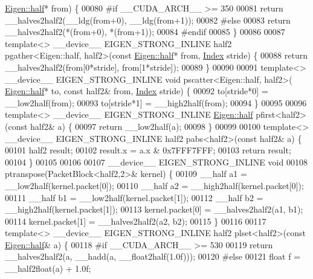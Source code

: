 \begin{DoxyCode}
      \hyperlink{struct_eigen_1_1half}{Eigen::half}* from) \{
00080 \textcolor{preprocessor}{#if \_\_CUDA\_ARCH\_\_ >= 350}
00081    \textcolor{keywordflow}{return} \_\_halves2half2(\_\_ldg(from+0), \_\_ldg(from+1));
00082 \textcolor{preprocessor}{#else}
00083   \textcolor{keywordflow}{return} \_\_halves2half2(*(from+0), *(from+1));
00084 \textcolor{preprocessor}{#endif}
00085 \}
00086 
00087 \textcolor{keyword}{template}<> \_\_device\_\_ EIGEN\_STRONG\_INLINE half2 pgather<Eigen::half, half2>(\textcolor{keyword}{const} 
      \hyperlink{struct_eigen_1_1half}{Eigen::half}* from, \hyperlink{namespace_eigen_a62e77e0933482dafde8fe197d9a2cfde}{Index} stride) \{
00088   \textcolor{keywordflow}{return} \_\_halves2half2(from[0*stride], from[1*stride]);
00089 \}
00090 
00091 \textcolor{keyword}{template}<> \_\_device\_\_ EIGEN\_STRONG\_INLINE \textcolor{keywordtype}{void} pscatter<Eigen::half, half2>(
      \hyperlink{struct_eigen_1_1half}{Eigen::half}* to, \textcolor{keyword}{const} half2& from, \hyperlink{namespace_eigen_a62e77e0933482dafde8fe197d9a2cfde}{Index} stride) \{
00092   to[stride*0] = \_\_low2half(from);
00093   to[stride*1] = \_\_high2half(from);
00094 \}
00095 
00096 \textcolor{keyword}{template}<> \_\_device\_\_ EIGEN\_STRONG\_INLINE \hyperlink{struct_eigen_1_1half}{Eigen::half} pfirst<half2>(\textcolor{keyword}{const} half2& a) \{
00097   \textcolor{keywordflow}{return} \_\_low2half(a);
00098 \}
00099 
00100 \textcolor{keyword}{template}<> \_\_device\_\_ EIGEN\_STRONG\_INLINE half2 pabs<half2>(\textcolor{keyword}{const} half2& a) \{
00101   half2 result;
00102   result.x = a.x & 0x7FFF7FFF;
00103   \textcolor{keywordflow}{return} result;
00104 \}
00105 
00106 
00107 \_\_device\_\_ EIGEN\_STRONG\_INLINE \textcolor{keywordtype}{void}
00108 ptranspose(PacketBlock<half2,2>& kernel) \{
00109   \_\_half a1 = \_\_low2half(kernel.packet[0]);
00110   \_\_half a2 = \_\_high2half(kernel.packet[0]);
00111   \_\_half b1 = \_\_low2half(kernel.packet[1]);
00112   \_\_half b2 = \_\_high2half(kernel.packet[1]);
00113   kernel.packet[0] = \_\_halves2half2(a1, b1);
00114   kernel.packet[1] = \_\_halves2half2(a2, b2);
00115 \}
00116 
00117 \textcolor{keyword}{template}<> \_\_device\_\_ EIGEN\_STRONG\_INLINE half2 plset<half2>(\textcolor{keyword}{const} \hyperlink{struct_eigen_1_1half}{Eigen::half}& a) \{
00118 \textcolor{preprocessor}{#if \_\_CUDA\_ARCH\_\_ >= 530}
00119   \textcolor{keywordflow}{return} \_\_halves2half2(a, \_\_hadd(a, \_\_float2half(1.0f)));
00120 \textcolor{preprocessor}{#else}
00121   \textcolor{keywordtype}{float} f = \_\_half2float(a) + 1.0f;

\end{DoxyCode}
